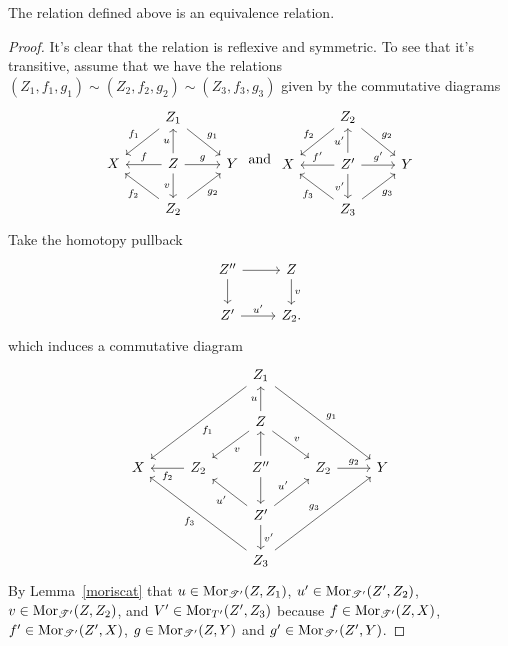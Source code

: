 \documentclass[dissertation.tex]{subfiles}
\begin{document}
\begin{lem}
  The relation defined above is an equivalence relation.
  
  \begin{proof}
    It's clear that the relation is reflexive and symmetric.
    To see that it's transitive, assume that we have the relations $(Z_1,f_1,g_1) \sim (Z_2, f_2,g_2) \sim (Z_3,f_3,g_3)$
    given by the commutative diagrams
    $$\begin{tikzcd}
      & Z_1\arrow[swap]{ld}{f_1}\arrow{rd}{g_1}\\
      X & Z \arrow[swap]{l}{f}\arrow{r}{g}\arrow{u}{u}\arrow[swap]{d}{v} & Y\\
      & Z_2\arrow{ul}{f_2}\arrow[swap]{ur}{g_2}
    \end{tikzcd}
    \ \text{and}\ 
    \begin{tikzcd}
      & Z_2\arrow[swap]{ld}{f_2}\arrow{rd}{g_2}\\
      X & Z^\prime \arrow[swap]{l}{f^\prime}\arrow{r}{g^\prime}\arrow{u}{u^\prime}\arrow[swap]{d}{v^\prime} & Y\\
      & Z_3\arrow{ul}{f_3}\arrow[swap]{ur}{g_3}
    \end{tikzcd}$$
    Take the homotopy pullback
    $$\begin{tikzcd}
      Z^{\prime\prime} \arrow{r}\arrow{d} & Z\arrow{d}{v}\\
      Z^\prime \arrow{r}{u^\prime} & Z_2.
    \end{tikzcd}$$
    which induces a commutative diagram
    $$\begin{tikzcd}
      & & Z_1 \arrow{lldd}{f_1}\arrow{rrdd}{g_1}\\
      & & Z\arrow{u}{u}\arrow{ld}{v}\arrow{rd}{v}\\
      X & Z_2\arrow{l}{f_2} & Z^{\prime\prime}\arrow{u}\arrow{d} & Z_2\arrow{r}{g_2} & Y\\
      & & Z^\prime\arrow{lu}{u^\prime}\arrow{ru}{u^\prime}\arrow{d}{v^\prime}\\
      & & Z_3\arrow{lluu}{f_3} \arrow{rruu}{g_3}
    \end{tikzcd}$$
    By Lemma~\ref{moriscat} that $u \in \operatorname{Mor}_{\mathscr{T}^\prime}(Z,Z_1)$, $u^\prime \in \operatorname{Mor}_{\mathscr{T}^\prime}(Z^\prime, Z_2)$, $v \in \operatorname{Mor}_{\mathscr{T}^\prime}(Z,Z_2)$, and $V^\prime \in \operatorname{Mor}_{T^\prime}(Z^\prime,Z_3)$ because $f \in \operatorname{Mor}_{\mathscr{T}^\prime}(Z,X)$, $f^\prime \in \operatorname{Mor}_{\mathscr{T}^\prime}(Z^\prime,X)$, $g \in \operatorname{Mor}_{\mathscr{T}^\prime}(Z,Y)$ and $g^\prime \in \operatorname{Mor}_{\mathscr{T}^\prime}(Z^\prime,Y)$.
    
  \end{proof}
\end{lem}
\end{document}
